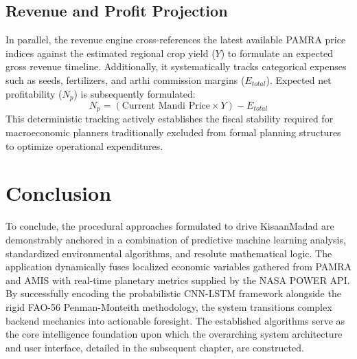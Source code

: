 \subsection{Revenue and Profit Projection}
In parallel, the revenue engine cross-references the latest available PAMRA price indices against the estimated regional crop yield ($Y$) to formulate an expected gross revenue timeline. Additionally, it systematically tracks categorical expenses such as seeds, fertilizers, and arthi commission margins ($E_{total}$). Expected net profitability ($N_p$) is subsequently formulated:
\begin{equation}
    N_p = (\text{Current Mandi Price} \times Y) - E_{total}
\end{equation}
This deterministic tracking actively establishes the fiscal stability required for macroeconomic planners traditionally excluded from formal planning structures to optimize operational expenditures.

\section{Conclusion}

To conclude, the procedural approaches formulated to drive KisaanMadad are demonstrably anchored in a combination of predictive machine learning analysis, standardized environmental algorithms, and resolute mathematical logic. The application dynamically fuses localized economic variables gathered from PAMRA and AMIS with real-time planetary metrics supplied by the NASA POWER API. By successfully encoding the probabilistic CNN-LSTM framework alongside the rigid FAO-56 Penman-Monteith methodology, the system transitions complex backend mechanics into actionable foresight. The established algorithms serve as the core intelligence foundation upon which the overarching system architecture and user interface, detailed in the subsequent chapter, are constructed.
